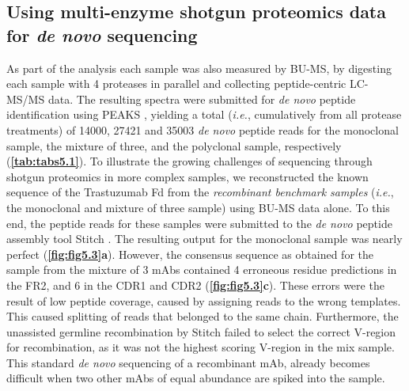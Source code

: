 \subsection{Using multi-enzyme shotgun proteomics data for \emph{de novo} sequencing}
\label{ch:bu-ms}
As part of the analysis each sample was also measured by BU-MS, by digesting each sample with 4 proteases in parallel and collecting peptide-centric LC-MS/MS data. The resulting spectra were submitted for \emph{de novo} peptide identification using PEAKS \cite{ma2003peaks:}, yielding a total (\emph{i.e.}, cumulatively from all protease treatments) of 14000, 27421 and 35003 \emph{de novo} peptide reads for the monoclonal sample, the mixture of three, and the polyclonal sample, respectively (\textbf{\autoref{tab:tabs5.1}}). To illustrate the growing challenges of sequencing through shotgun proteomics in more complex samples, we reconstructed the known sequence of the Trastuzumab Fd from the \emph{recombinant benchmark samples} (\emph{i.e.}, the monoclonal and mixture of three sample) using BU-MS data alone. To this end, the peptide reads for these samples were submitted to the \emph{de novo} peptide assembly tool Stitch \cite{schulte2022template-based}. The resulting output for the monoclonal sample was nearly perfect (\textbf{\autoref{fig:fig5.3}a}). However, the consensus sequence as obtained for the sample from the mixture of 3 mAbs contained 4 erroneous residue predictions in the FR2, and 6 in the CDR1 and CDR2 (\textbf{\autoref{fig:fig5.3}c}). These errors were the result of low peptide coverage, caused by assigning reads to the wrong templates. This caused splitting of reads that belonged to the same chain. Furthermore, the unassisted germline recombination by Stitch failed to select the correct V-region for recombination, as it was not the highest scoring V-region in the mix sample. This standard \emph{de novo} sequencing of a recombinant mAb, already becomes difficult when two other mAbs of equal abundance are spiked into the sample.
